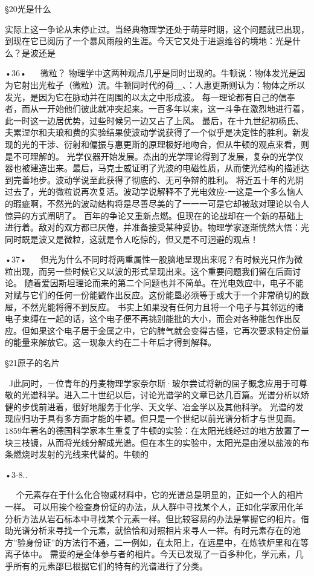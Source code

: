 §20光是什么

实际上这一争论从末停止过。当经典物理学还处于萌芽时期，这个问题就已出现，到现在它已阅历了一个暴风雨般的生涯。今天它又处于进退维谷的境地：光是什么？是波还是

•36•
  
微粒？
物理学中这两种观点几乎是同时出现的。牛顿说：物体发光是因为它射出光粒子（微粒）流。牛顿同时代的荷＿、：人惠更斯则认为：物体之所以发光，是因为它在脉动并在周围的以太之中形成波。
每一理论都有自己的信奉者，而从一开始他们彼此就冲突起来。一百多年以来，这一斗争在激烈地进行着，此一时这一边居优势，过些时候另一边又占了上风。
最后，在十九世纪初杨氏、夫累涅尔和夫琅和费的实验结果使波动学说获得了一个似乎是决定性的胜利。新发现的光的干涉、衍射和偏振与惠更斯的原理极好地吻合，但从牛顿的观点来看，则是不可理解的。
光学仪器开始发展。杰出的光学理论得到了发展，复杂的光学仪器也被建造出来。最后，马克士威证明了光波的电磁性质，从而使光结构的描述达到完善地步。波动学说至此获得了彻底的、无可争辩的胜利。
将近五十年的光阴过去了，光的微粒说再次复活。波动学说解释不了光电效应-一这是一个多么恼人的瑕疵啊，不然光的波动结构将是尽善尽美的了一一一可是它却被敌对理论以令人惊异的方式阐明了。
百年的争论又重新点燃。但现在的论战却在一个新的基础上进行着。敌对的双方都已厌倦，并准备接受某种妥协。物理学家逐渐恍然大悟：光同时既是波又是微粒，这就是令人吃惊的，但又是不可迥避的观点！

•37•
  
但光为什么不同时将两重属性一股脑地呈现出来呢？有时候光只作为微粒出现，而另一些时候它又以波的形式呈现出来。这个重要问题我们留在后面讨论。
随着爱因斯坦理论而来的第二个问题也并不简单。在光电效应中，电子不能对赋与它们的任何一份能戳作出反应。这份能垦必须等于或大于一个非常确切的数屉，不然光能将得不到反应。
书实上如果没有任何力且将一个电子与其邻远的诸电子束缚在一起的话，这个电子便不再挑别能批的大小，而会对各种能包作出反应。但如果这个电子居于金属之中，它的脾气就会变得古怪，它再次要求特定份量的能量来解放它。这一现象大约在二十年后才得到解释。

§21原子的名片

~J此同时，－位青年的丹麦物理学家奈尔斯·玻尔尝试将新的屈子概念应用于可尊敬的光谱科学。进入二十世纪以后，讨论光谱学的文章已达几百篇。光谱分析以矫健的步伐前进着，很好地服务于化学、天文学、冶金学以及其他科学。
光谱的发现应归功于具有多方面才能的牛顿。但只是一个世纪以前光谱分析才与世见面。1859年著名的德国科学家本生重复了牛顿的实验：在太阳光线经过的地方放置了一块三枝镜，从而将光线分解成光谱。但在本生的实验中，太阳光是由浸以盐液的布条燃烧时发射的光线来代替的。牛顿的

•3-8..
  



  
个元素存在于什么化合物或材料中，它的光谱总是明显的，正如一个人的相片一样。
可以用挨个检查身份证的办法，从人群中寻找某个人，正如化学家用化羊分析方法从岩石标本中寻找某个元素一样。但比较容易的办法是掌握它的相片。借助光谱分析来寻找一个元素，就恰恰和对照相片来寻人一祥。有时元素存在的池方”验身份证”的方法行不通，二一例如，在太阳上，在远星中，在炼铁炉里和在等离子体中。
需要的是全体参与者的相片。今天已发现了一百多种化，学元素，几乎所有的元素邵巳根据它们的特有的光谱进行了分类。

